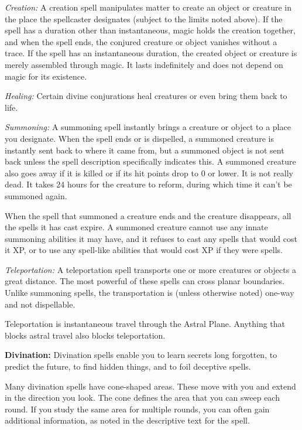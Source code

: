 \textit{Creation:} A creation spell manipulates matter to create an object or creature in the place the spellcaster designates (subject to the limits noted above). If the spell has a duration other than instantaneous, magic holds the creation together, and when the spell ends, the conjured creature or object vanishes without a trace. If the spell has an instantaneous duration, the created object or creature is merely assembled through magic. It lasts indefinitely and does not depend on magic for its existence.

\textit{Healing:} Certain divine conjurations heal creatures or even bring them back to life.

\textit{Summoning:} A summoning spell instantly brings a creature or object to a place you designate. When the spell ends or is dispelled, a summoned creature is instantly sent back to where it came from, but a summoned object is not sent back unless the spell description specifically indicates this. A summoned creature also goes away if it is killed or if its hit points drop to 0 or lower. It is not really dead. It takes 24 hours for the creature to reform, during which time it can't be summoned again.

When the spell that summoned a creature ends and the creature disappears, all the spells it has cast expire. A summoned creature cannot use any innate summoning abilities it may have, and it refuses to cast any spells that would cost it XP, or to use any spell-like abilities that would cost XP if they were spells.

\textit{Teleportation:} A teleportation spell transports one or more creatures or objects a great distance. The most powerful of these spells can cross planar boundaries. Unlike summoning spells, the transportation is (unless otherwise noted) one-way and not dispellable.

Teleportation is instantaneous travel through the Astral Plane. Anything that blocks astral travel also blocks teleportation.

\textbf{Divination:} Divination spells enable you to learn secrets long forgotten, to predict the future, to find hidden things, and to foil deceptive spells.

Many divination spells have cone-shaped areas. These move with you and extend in the direction you look. The cone defines the area that you can sweep each round. If you study the same area for multiple rounds, you can often gain additional information, as noted in the descriptive text for the spell.

